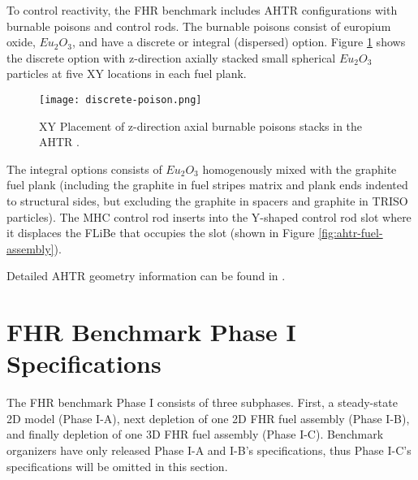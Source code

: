 To control reactivity, the \gls{FHR} benchmark includes \gls{AHTR} configurations
with burnable poisons and control rods. 
The burnable poisons consist of europium oxide, $Eu_2O_3$, and have a discrete
or integral (dispersed) option. 
Figure \ref{fig:discrete-poison} shows the discrete option with z-direction axially 
stacked small spherical $Eu_2O_3$ particles at five XY locations in each 
fuel plank. 
\begin{figure}[htbp]
    \centering
    \texttt{[image: discrete-poison.png]}
    \caption{XY Placement of z-direction axial burnable poisons stacks in the \acrlong{AHTR} 
    \cite{noauthor_fluoride_nodate}.}
    \label{fig:discrete-poison}
\end{figure}
The integral options consists of $Eu_2O_3$ homogenously mixed with the graphite 
fuel plank (including the graphite in fuel stripes matrix and plank ends 
indented to structural sides, but excluding the graphite in spacers and 
graphite in TRISO particles).
The \gls{MHC} control rod inserts into the Y-shaped control rod slot where it 
displaces the \gls{FLiBe} that occupies the slot 
(shown in Figure \ref{fig:ahtr-fuel-assembly}). 

Detailed \gls{AHTR} geometry information can be found in \cite{petrovic_benchmark_2021}.

\section{FHR Benchmark Phase I Specifications}
\label{sec:phase1}
The \gls{FHR} benchmark Phase I consists of three subphases.
First, a steady-state 2D model (Phase I-A), next depletion of one 2D \gls{FHR} fuel 
assembly (Phase I-B), and finally depletion of one 3D \gls{FHR} fuel assembly 
(Phase I-C).
Benchmark organizers have only released Phase I-A and I-B's specifications, thus 
Phase I-C's specifications will be omitted in this section.

